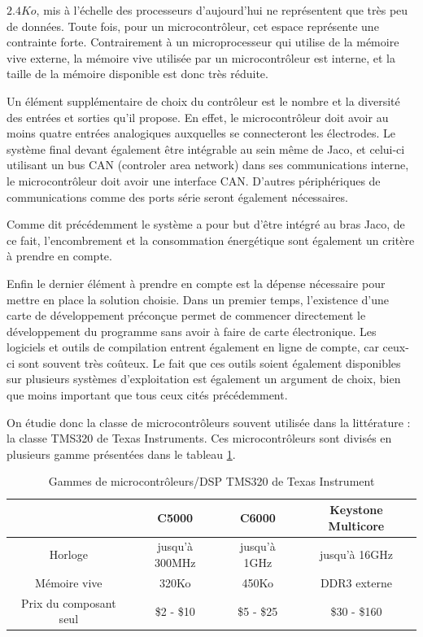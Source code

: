 \documentclass[letterpaper, twoside, 12pt, memoire, creativecommons, hyperref]{thETS}
\begin{document}
$2.4Ko$, mis à l'échelle des processeurs d'aujourd'hui ne représentent que très peu de données. Toute fois, pour un microcontrôleur, cet espace représente une contrainte forte. Contrairement à un microprocesseur qui utilise de la mémoire vive externe, la mémoire vive utilisée par un microcontrôleur est interne, et la taille de la mémoire disponible est donc très réduite. 

Un élément supplémentaire de choix du contrôleur est le nombre et la diversité des entrées et sorties qu'il propose. En effet, le microcontrôleur doit avoir au moins quatre entrées analogiques auxquelles se connecteront les électrodes. Le système final devant également être intégrable au sein même de Jaco, et celui-ci utilisant un bus CAN (controler area network) dans ses communications interne, le microcontrôleur doit avoir une interface CAN. D'autres périphériques de communications comme des ports série seront également nécessaires. 

Comme dit précédemment le système a pour but d'être intégré au bras Jaco, de ce fait, l'encombrement et la consommation énergétique sont également un critère à prendre en compte.

Enfin le dernier élément à prendre en compte est la dépense nécessaire pour mettre en place la solution choisie. Dans un premier temps, l'existence d'une carte de développement préconçue permet de commencer directement le développement du programme sans avoir à faire de carte électronique. Les logiciels et outils de compilation entrent également en ligne de compte, car ceux-ci sont souvent très coûteux. Le fait que ces outils soient également disponibles sur plusieurs systèmes d'exploitation est également un argument de choix, bien que moins important que tous ceux cités précédemment. 

On étudie donc la classe de microcontrôleurs souvent utilisée dans la littérature : la classe TMS320 de Texas Instruments.
Ces microcontrôleurs sont divisés en plusieurs gamme présentées dans le tableau \ref{tab:tms320}.

\begin{table}[ht]
	\caption{Gammes de microcontrôleurs/DSP TMS320 de Texas Instrument }
		\begin{tabular}{|c|c|c|c|}
		\hline
			& C5000 & C6000 & Keystone Multicore\\
	    \hline
	    	Horloge & jusqu'à 300MHz & jusqu'à 1GHz & jusqu'à 16GHz\\
	    \hline
			Mémoire vive & 320Ko & 450Ko & DDR3 externe\\
	    \hline
	    	Prix du composant seul & \$2 - \$10 & \$5 - \$25 & \$30 - \$160\\
	    \hline
		\end{tabular}
	\label{tab:tms320}
\end{table}
\end{document}
